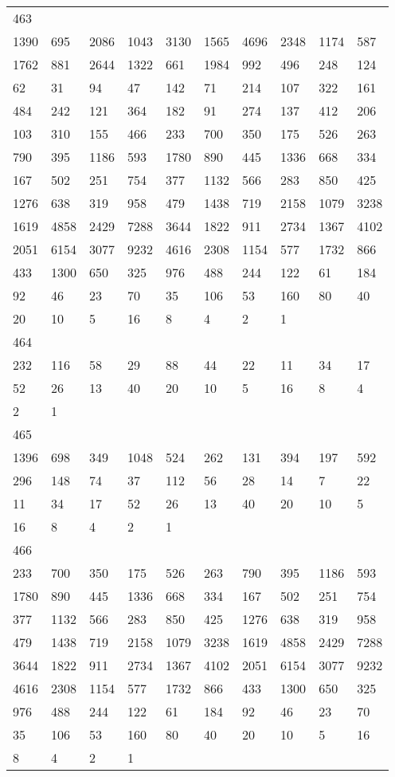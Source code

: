 \begin{longtable}{*{10}{l}}
463&&&&&&&&&\\
1390& 695& 2086& 1043& 3130& 1565& 4696& 2348& 1174& 587\\
1762& 881& 2644& 1322& 661& 1984& 992& 496& 248& 124\\
62& 31& 94& 47& 142& 71& 214& 107& 322& 161\\
484& 242& 121& 364& 182& 91& 274& 137& 412& 206\\
103& 310& 155& 466& 233& 700& 350& 175& 526& 263\\
790& 395& 1186& 593& 1780& 890& 445& 1336& 668& 334\\
167& 502& 251& 754& 377& 1132& 566& 283& 850& 425\\
1276& 638& 319& 958& 479& 1438& 719& 2158& 1079& 3238\\
1619& 4858& 2429& 7288& 3644& 1822& 911& 2734& 1367& 4102\\
2051& 6154& 3077& 9232& 4616& 2308& 1154& 577& 1732& 866\\
433& 1300& 650& 325& 976& 488& 244& 122& 61& 184\\
92& 46& 23& 70& 35& 106& 53& 160& 80& 40\\
20& 10& 5& 16& 8& 4& 2& 1& \\

464&&&&&&&&&\\
232& 116& 58& 29& 88& 44& 22& 11& 34& 17\\
52& 26& 13& 40& 20& 10& 5& 16& 8& 4\\
2& 1& \\

465&&&&&&&&&\\
1396& 698& 349& 1048& 524& 262& 131& 394& 197& 592\\
296& 148& 74& 37& 112& 56& 28& 14& 7& 22\\
11& 34& 17& 52& 26& 13& 40& 20& 10& 5\\
16& 8& 4& 2& 1& \\

466&&&&&&&&&\\
233& 700& 350& 175& 526& 263& 790& 395& 1186& 593\\
1780& 890& 445& 1336& 668& 334& 167& 502& 251& 754\\
377& 1132& 566& 283& 850& 425& 1276& 638& 319& 958\\
479& 1438& 719& 2158& 1079& 3238& 1619& 4858& 2429& 7288\\
3644& 1822& 911& 2734& 1367& 4102& 2051& 6154& 3077& 9232\\
4616& 2308& 1154& 577& 1732& 866& 433& 1300& 650& 325\\
976& 488& 244& 122& 61& 184& 92& 46& 23& 70\\
35& 106& 53& 160& 80& 40& 20& 10& 5& 16\\
8& 4& 2& 1& \\


\end{longtable}
